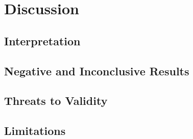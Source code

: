 %

\chapter{Discussion}\label{ch:discussion}


\section{Interpretation}\label{sec:disc:interpretation}
\section{Negative and Inconclusive Results}\label{sec:disc:negative}
\section{Threats to Validity}\label{sec:disc:threats}
\section{Limitations}\label{sec:disc:limitations}
